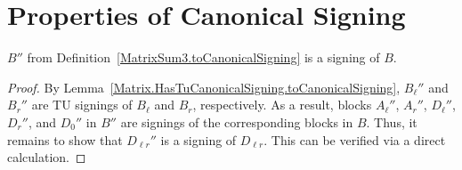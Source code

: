 \section{Properties of Canonical Signing}

\begin{lemma}
    \label{MatrixSum3.HasCanonicalSigning.toCanonicalSigning}
    \leanok
    $B''$ from Definition~\ref{MatrixSum3.toCanonicalSigning} is a signing of $B$.
\end{lemma}

\begin{proof}
    \leanok
    By Lemma~\ref{Matrix.HasTuCanonicalSigning.toCanonicalSigning}, $B_{\ell}''$ and $B_{r}''$ are TU signings of $B_{\ell}$ and $B_{r}$, respectively. As a result, blocks $A_{\ell}''$, $A_{r}''$, $D_{\ell}''$, $D_{r}''$, and $D_{0}''$ in $B''$ are signings of the corresponding blocks in $B$. Thus, it remains to show that $D_{\ell r}''$ is a signing of $D_{\ell r}$. This can be verified via a direct calculation. 
\end{proof}

